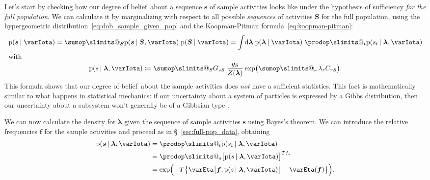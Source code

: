 \documentclass[\ifafour a4paper,12pt,\else a5paper,10pt,\fi%
onecolumn,oneside,article,%
british%
]{memoir}
\makeatletter
\theoremstyle{remark}
\theoremstyle{innote}
\def\sum{\DOTSI\sumop\slimits@}
\def\prod{\DOTSI\prodop\slimits@}
\newcommand*{\citep}{\parencites}
\newcommand*{\di}{\mathrm{d}}%
\newcommand*{\RR}{\bm{\mathrm{R}}}
\newcommand*{\defd}{\coloneqq}
\newcommand*{\pf}{\mathrm{p}}%
\renewcommand*{\|}{\nonscript\,\vert\nonscript\;\mathopen{}}
\newcommand*{\sect}{\S}%
\newcommand*{\tsum}{\mathop{\textstyle\sum}\nolimits}
\newcommand*{\dob}{degree of belief}
\newcommand*{\yS}{S}
\newcommand*{\ySt}{\bm{\yS}}
\newcommand*{\ys}{s}
\newcommand*{\yst}{\bm{\ys}}
\newcommand*{\yll}{\lambda}
\newcommand*{\yl}{\bm{\lambda}}
\newcommand*{\yg}{g}
\newcommand*{\yI}{\varIota}
\newcommand*{\yf}{\bm{f}}
\newcommand*{\yH}{\varEta}
\makeatother
\begin{document}
Let's start by checking how our \dob\ about a sequence $\yst$ of sample
activities looks like under the hypothesis of sufficiency \emph{for the
  full population}. We can calculate it by marginalizing with respect to
all possible \emph{sequences} of activities $\ySt$ for the full population, using
the hypergeometric distribution~\eqref{eq:dob_sample_given_pop} and the
Koopman-Pitman formula~\eqref{eq:koopman-pitman}:
\begin{subequations}
  \label{eq:koopman-pitman_sample}
  \begin{gather}
      \pf( \yst \| \yI) =\sum_{\ySt} \pf(\yst \| \ySt, \yI)\;\pf(\ySt \| \yI)
=    \int\!\di\yl\; \pf(\yl \| \yI)\; \prod_{t}\pf(\ys_{t} \| \yl, \yI)
    \label{eq:koopman-pitman_integral_sample}
    \\
    \shortintertext{with}
    \pf(\ys \| \yl, \yI) \defd
\sum_{\yS} G_{\ys\yS}\;
    \frac{\yg_{\yS}}{Z(\yl)}
    \exp\bigl(\tsum_{r} \yll_r C_{r\yS}\bigr).
    \label{eq:koopman-pitman_likelihood_sample}
  \end{gather}
\end{subequations}
This formula shows that our \dob\ about the sample activities does
\emph{not} have a sufficient statistics. This fact is mathematically
similar to what happens in statistical mechanics: if our uncertainty about
a system of particles is expressed by a Gibbs distribution, then our
uncertainty about a subsystem won't generally be of a Gibbsian type
\citep{maesetal1999}.


We can now calculate the density for $\yl$ given the sequence of sample
activities $\yst$ using Bayes's theorem. We can introduce the relative
frequencies $\yf$ for the sample activities and proceed as in
\sect~\ref{sec:full-pop_data}, obtaining
\begin{equation}
  \label{eq:to_maxent_sample}
  \begin{split}
  \pf(\yst \| \yl, \yI) &= \prod_{t} \pf(\ys_{t} \| \yl, \yI)
    \\ &=
    \prod_{\ys}\bigl[ \pf(\ys \| \yl, \yI) \bigr]^{T f_{\ys}}
    \\ &=
    \exp\Bigl(-T\bigl\{
    \yH\bigl[\yf, \pf(\ys \| \yl, \yI)\bigr]
    -\yH(\yf)\bigr\}\Bigr).
\end{split}
\end{equation}
\end{document}
